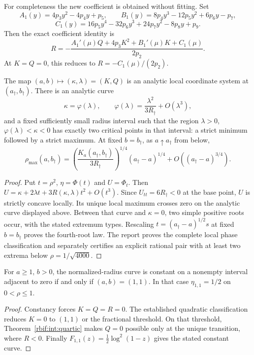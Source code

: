 For completeness the new coefficient is obtained without fitting.
Set
\[
 A_1(y)=4p_3y^2-4p_4y+p_5,\qquad
 B_1(y)=8p_4y^3-12p_5y^2+6p_6y-p_7,
\]
\[
 C_1(y)=16p_5y^4-32p_6y^3+24p_7y^2-8p_8y+p_9.
\]
Then the exact coefficient identity is
\[
 R=-\frac{A_1'(\mu)Q+4p_3K^2+B_1'(\mu)K+C_1(\mu)}{2p_2}.
\]
At $K=Q=0$, this reduces to $R=-C_1(\mu)/(2p_2)$.

\begin{theorem}
\label{rbif:int:fold}
The map $(a,b)\mapsto(\kappa,\lambda)=(K,Q)$ is an analytic local
coordinate system at $(a_\dagger,b_\dagger)$. There is an analytic curve
\[
 \kappa=\varphi(\lambda),\qquad
 \varphi(\lambda)=\frac{\lambda^2}{3R_\dagger}+O(\lambda^3),
\]
and a fixed sufficiently small radius interval such that the region
$\lambda>0$, $\varphi(\lambda)<\kappa<0$ has exactly two critical
points in that interval: a strict minimum followed by a strict maximum.
At fixed $b=b_\dagger$, as $a\uparrow a_\dagger$ from below,
\[
 \rho_{\max}(a,b_\dagger)
 =\left(\frac{K_a(a_\dagger,b_\dagger)}{3R_\dagger}\right)^{1/4}
    (a_\dagger-a)^{1/4}+O((a_\dagger-a)^{3/4}).
\]
\end{theorem}
\begin{proof}
Put $t=\rho^2$, $\eta=\Phi(t)$ and $U=\Phi_t$. Then
$U=\kappa+2\lambda t+3R(\kappa,\lambda)t^2+O(t^3)$.
Since $U_{tt}=6R_\dagger<0$ at the base point, $U$ is strictly
concave locally. Its unique local maximum crosses zero on the analytic
curve displayed above. Between that curve and $\kappa=0$, two simple
positive roots occur, with the stated extremum types. Rescaling
$t=(a_\dagger-a)^{1/2}s$ at fixed $b=b_\dagger$ proves the
fourth-root law. The report proves the complete local phase classification
and separately certifies an explicit rational pair with at least two
extrema below $\rho=1/\sqrt{4000}$.
\end{proof}

\begin{corollary}
\label{rbif:int:rigidity}
For $a\ge1$, $b>0$, the normalized-radius curve is constant on a
nonempty interval adjacent to zero if and only if $(a,b)=(1,1)$.
In that case $\eta_{1,1}=1/2$ on $0<\rho\le1$.
\end{corollary}
\begin{proof}
Constancy forces $K=Q=R=0$. The established quadratic classification
reduces $K=0$ to $(1,1)$ or the fractional threshold. On that threshold,
Theorem~\ref{rbif:int:quartic} makes $Q=0$ possible only at the unique
transition, where $R<0$. Finally
$F_{1,1}(z)=\tfrac12\log^2(1-z)$ gives the stated constant curve.
\end{proof}

